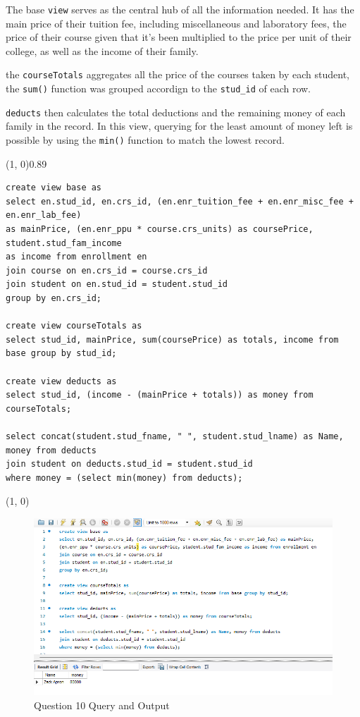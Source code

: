
The base \texttt{view} serves as the central hub of all the information needed. It has the main price of their tuition fee, including miscellaneous and laboratory fees, the price of their course given that it's been multiplied to the price per unit of their college, as well as the income of their family.

the \texttt{courseTotals} aggregates all the price of the courses taken by each student, the \texttt{sum()} function was grouped accordign to the \texttt{stud\_id} of each row. 

\texttt{deducts} then calculates the total deductions and the remaining money of each family in the record. In this view, querying for the least amount of money left is possible by using the \texttt{min()} function to match the lowest record.
\vspace{\baselineskip}

\sol{}
\noindent\line(1, 0){0.89\linewidth}
\begin{verbatim}
create view base as
select en.stud_id, en.crs_id, (en.enr_tuition_fee + en.enr_misc_fee + en.enr_lab_fee)
as mainPrice, (en.enr_ppu * course.crs_units) as coursePrice, student.stud_fam_income
as income from enrollment en
join course on en.crs_id = course.crs_id
join student on en.stud_id = student.stud_id
group by en.crs_id;

create view courseTotals as
select stud_id, mainPrice, sum(coursePrice) as totals, income from base group by stud_id;

create view deducts as
select stud_id, (income - (mainPrice + totals)) as money from courseTotals;

select concat(student.stud_fname, " ", student.stud_lname) as Name, money from deducts 
join student on deducts.stud_id = student.stud_id
where money = (select min(money) from deducts);
\end{verbatim}
\noindent\line(1, 0){\linewidth}

\begin{figure}[H]
    \centering
    \includegraphics[width=0.7\linewidth]{images/q10.png}
    \caption{Question 10 Query and Output}
\end{figure}
